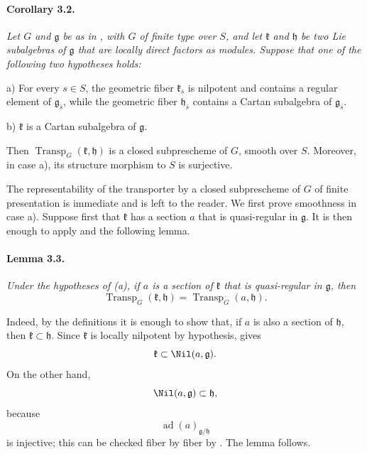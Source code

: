 
\paragraph{\textbf{Corollary 3.2.}}
{\itshape Let \(G\) and \(\mathfrak g\) be as in , with \(G\)
of finite type over \(S\), and let \(\mathfrak k\) and
\(\mathfrak h\) be two Lie subalgebras of \(\mathfrak g\) that are
locally direct factors as modules. Suppose that one of the following
two hypotheses holds:

\smallskip
\noindent
\textup{a)}
For every \(s\in S\), the geometric fiber
\(\mathfrak k_{\bar s}\) is nilpotent and contains a regular element
of \(\mathfrak g_{\bar s}\), while the geometric fiber
\(\mathfrak h_{\bar s}\) contains a Cartan subalgebra of
\(\mathfrak g_{\bar s}\).

\smallskip
\noindent
\textup{b)}
\(\mathfrak k\) is a Cartan subalgebra of \(\mathfrak g\).

\smallskip
\noindent
Then \(\operatorname{Transp}_G(\mathfrak k,\mathfrak h)\) is a
closed subprescheme of \(G\), smooth over \(S\). Moreover, in case
\textup{a)}, its structure morphism to \(S\) is surjective.}

The representability of the transporter by a closed subprescheme of
\(G\) of finite presentation is immediate and is left to the
reader. We first prove smoothness in case \textup{a)}. Suppose first
that \(\mathfrak k\) has a section \(a\) that is quasi-regular in
\(\mathfrak g\). It is then enough to apply  and the following
lemma.

\paragraph{\textbf{Lemma 3.3.}}
{\itshape Under the hypotheses of \textup{(a)}, if \(a\) is a
section of \(\mathfrak k\) that is quasi-regular in
\(\mathfrak g\), then
\[
  \operatorname{Transp}_G(\mathfrak k,\mathfrak h)
  =
  \operatorname{Transp}_G(a,\mathfrak h).
\]}

Indeed, by the definitions it is enough to show that, if \(a\) is
also a section of \(\mathfrak h\), then
\(\mathfrak k\subset\mathfrak h\). Since \(\mathfrak k\) is
locally nilpotent by hypothesis,  gives
\[
  \mathfrak k\subset\Nil(a,\mathfrak g).
\]
On the other hand,
\[
  \Nil(a,\mathfrak g)\subset\mathfrak h,
\]
because
\[
  \operatorname{ad}(a)_{\mathfrak g/\mathfrak h}
\]
is injective; this can be checked fiber by fiber by .
The lemma follows.


